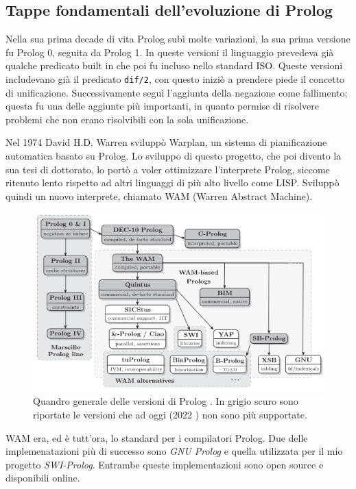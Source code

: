 \subsection{Tappe fondamentali dell'evoluzione di Prolog}
\label{subsec:tappe}
Nella sua prima decade di vita Prolog subì molte variazioni, la sua prima versione fu Prolog 0, seguita da Prolog 1. In queste versioni il linguaggio
prevedeva già qualche predicato built in che poi fu incluso nello standard ISO. Queste versioni includevano già il predicato \verb+dif/2+, con questo iniziò a prendere piede il concetto di unificazione. Successivamente seguì l'aggiunta
della negazione come fallimento; questa fu una delle aggiunte più importanti, in quanto permise di risolvere problemi che non erano risolvibili con la sola unificazione.

Nel 1974 David H.D. Warren sviluppò Warplan, un sistema di pianificazione automatica basato su Prolog. Lo sviluppo di questo progetto, che poi divento la sua tesi di dottorato, lo portò a voler ottimizzare l'interprete Prolog, siccome ritenuto lento rispetto ad altri linguaggi di più alto livello come LISP.
Sviluppò quindi un nuovo interprete, chiamato WAM (Warren Abstract Machine).

\begin{figure}[h!]
    \centering
    \includegraphics[scale=0.55]{images/prologimpl.png}
    \caption{Quandro generale delle versioni di Prolog \cite{korner2022fifty}. In grigio scuro sono riportate le versioni che ad oggi (2022 \cite{korner2022fifty}) non sono più supportate.}
    \label{fig:prologimpl}
\end{figure}

WAM era, ed è tutt'ora, lo standard per i compilatori Prolog. Due delle implemenatazioni più di successo 
sono \textit{GNU Prolog} e quella utilizzata per il mio progetto \textit{SWI-Prolog}. Entrambe queste implementazioni sono open source e disponibili online.

